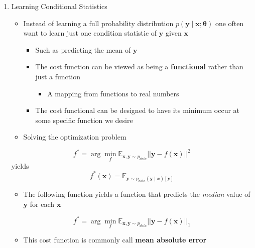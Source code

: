 \documentclass[11pt]{article}
\begin{document}
\begin{enumerate}
\item Learning Conditional Statistics
\label{sec:orgff421f1}
\begin{itemize}
\item Instead of learning a full probability distribution \(p(\pmb y \mid \pmb x; \pmb \theta)\) one often want to learn just one condition statistic of \(\pmb y\) given \(\pmb x\)
\begin{itemize}
\item Such as predicting the mean of \(\pmb y\)
\item The cost function can be viewed as being a \textbf{functional} rather than just a function
\begin{itemize}
\item A mapping from functions to real numbers
\end{itemize}
\item The cost functional can be designed to have its minimum occur at some specific function we desire
\end{itemize}

\item Solving the optimization problem
\end{itemize}
\begin{equation}
  f^*=\arg\min_f\mathbb E_{\pmb x, \pmb y \sim p_{data}}||\pmb y - f(\pmb x)||^2
\end{equation}
yields
\begin{equation}
  f^*(\pmb x) = \mathbb E_{\pmb y \sim p_{data}(\pmb y \mid x)[\pmb y]}
\end{equation}

\begin{itemize}
\item The following function yields a function that predicts the \emph{median} value of \(\pmb y\) for each \(\pmb x\)
\end{itemize}
\begin{equation}
	f^*=\arg\min_f\mathbb E_{\pmb x, \pmb y \sim p_{data}}||\pmb y - f(\pmb x)||_1
\end{equation}
\begin{itemize}
\item This cost function is commonly call \textbf{mean absolute error}
\end{itemize}
\end{enumerate}
\end{document}

